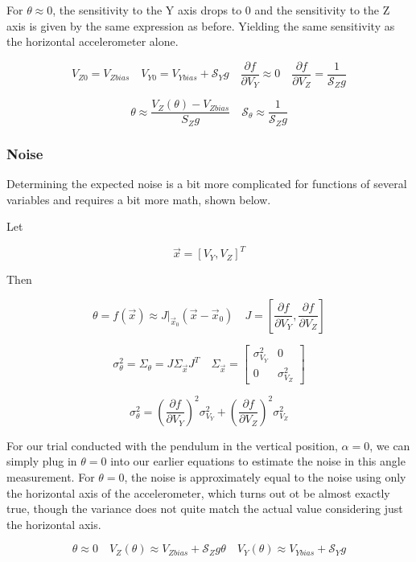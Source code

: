 \documentclass{article}
\theoremstyle{plain}
\theoremstyle{definition}
\theoremstyle{remark}
\newcommand{\Sens}{\mathcal{S}}
\begin{document}
For $\theta \approx 0$, the sensitivity to the Y axis drops to 0 and the sensitivity to the Z axis is given by the same expression as before. 
Yielding the same sensitivity as the horizontal accelerometer alone.

$$ V_{Z0} = V_{Zbias}  \quad  V_{Y0} = V_{Ybias} + \Sens_{Y} g  \quad \frac{\partial f}{\partial V_{Y}} \approx 0  \quad \frac{\partial f }{\partial V_Z} = \frac{1}{\Sens_{Z} g}$$

$$ \theta \approx \frac{V_{Z}(\theta) - V_{Zbias}}{S_Z g}  \quad \Sens_\theta \approx \frac{1}{\Sens_Z g}$$

\subsubsection{Noise}

Determining the expected noise is a bit more complicated for functions of several variables and requires a bit more math, shown below.   

Let 

$$ \vec{x} = \left[ V_Y, V_Z \right]^T $$

Then

$$ \theta = f(\vec{x}) \approx J|_{\vec{x}_0} \left( \vec{x} - \vec{x}_{0}\right) \quad J = \left[ \frac{\partial f}{\partial V_{Y}}, \frac{\partial f }{\partial V_Z} \right] $$

$$ \sigma^2_{\theta} = \Sigma_{\theta} = J \Sigma_{\vec{x}} J^T  \quad 
\Sigma_{\vec{x}} = \left[
\begin{matrix}
\sigma^2_{V_{Y}}  & 0 \\
0 & \sigma^2_{V_{Z}} 
\end{matrix} \right]$$

$$ \sigma^2_{\theta} = \left(\frac{\partial f}{\partial V_{Y}}\right)^2 \sigma^2_{V_{Y}} + \left(\frac{\partial f }{\partial V_Z} \right)^2 \sigma^2_{V_{Z}} $$

For our trial conducted with the pendulum in the vertical position, $\alpha = 0$, we can simply plug in $\theta = 0$ into our earlier equations to estimate the noise in this angle measurement.  For $\theta = 0$, the noise is approximately equal to the noise using only the horizontal axis of the accelerometer, which turns out ot be almost exactly true, though the variance does not quite match the actual value considering just the horizontal axis.

$$ \theta \approx 0 \quad V_{Z}(\theta) \approx V_{Zbias} + \Sens_{Z} g \theta \quad V_{Y}(\theta)  \approx V_{Ybias} + \Sens_{Y} g $$
\end{document}
